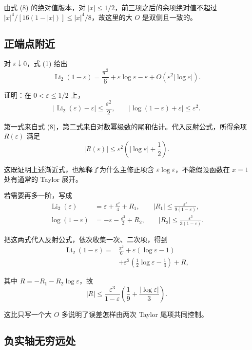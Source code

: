 \documentclass[11pt,a4paper]{article}
\begin{document}
由式 (8) 的绝对值版本，对
\(|x|\leqslant1/2\)，前三项之后的余项绝对值不超过
\(|x|^4/[16(1-|x|)]\leqslant|x|^4/8\)，故这里的大 \(O\) 是双侧且一致的。

\hypertarget{ux6b63ux7aefux70b9ux9644ux8fd1}{%
\subsection{正端点附近}\label{ux6b63ux7aefux70b9ux9644ux8fd1}}

对 \(\varepsilon\downarrow0\)，式 (1) 给出
\[
\operatorname{Li}_2(1-\varepsilon)
=\frac{\pi^2}{6}+\varepsilon\log\varepsilon-\varepsilon
+O\!\left(\varepsilon^2|\log\varepsilon|\right).
\]

证明：在 \(0<\varepsilon\leqslant1/2\) 上，
\[
|\operatorname{Li}_2(\varepsilon)-\varepsilon|\leqslant\frac{\varepsilon^2}{2},
\qquad
|\log(1-\varepsilon)+\varepsilon|\leqslant\varepsilon^2.
\]

第一式来自式 (8)，第二式来自对数幂级数的尾和估计。代入反射公式，所得余项
\(R(\varepsilon)\) 满足
\[
|R(\varepsilon)|\leqslant\varepsilon^2\left(|\log\varepsilon|+\frac12\right).
\]

这既证明上述渐近式，也解释了为什么主修正项含
\(\varepsilon\log\varepsilon\)，不能假设函数在 \(x=1\) 处有通常的 Taylor
展开。

若需要再多一阶，写成
\[
\begin{aligned}
\operatorname{Li}_2(\varepsilon)&=\varepsilon+\frac{\varepsilon^2}{4}+R_1,\qquad
|R_1|\leqslant\frac{\varepsilon^3}{9(1-\varepsilon)},\\
\log(1-\varepsilon)&=-\varepsilon-\frac{\varepsilon^2}{2}+R_2,\qquad
|R_2|\leqslant\frac{\varepsilon^3}{3(1-\varepsilon)}.
\end{aligned}
\]

把这两式代入反射公式，依次收集一次、二次项，得到
\[
\begin{aligned}
\operatorname{Li}_2(1-\varepsilon)
={}&\frac{\pi^2}{6}+\varepsilon(\log\varepsilon-1)\\
&+\varepsilon^2\left(\frac12\log\varepsilon-\frac14\right)+R,
\end{aligned}
\]

其中 \(R=-R_1-R_2\log\varepsilon\)，故
\[
|R|\leqslant\frac{\varepsilon^3}{1-\varepsilon}
\left(\frac19+\frac{|\log\varepsilon|}{3}\right).
\]

这比只写一个大 \(O\) 多说明了误差怎样由两次 Taylor 尾项共同控制。

\hypertarget{ux8d1fux5b9eux8f74ux65e0ux7a77ux8fdcux5904}{%
\subsection{负实轴无穷远处}\label{ux8d1fux5b9eux8f74ux65e0ux7a77ux8fdcux5904}}
\end{document}
